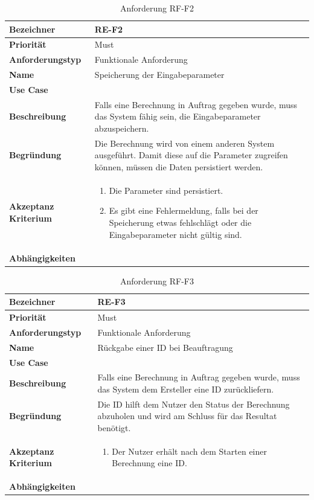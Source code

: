 \begin{table}[ht]
\centering
  \begin{tabular}{ l | p{8cm} }
	\hline
	\rowcolor{gray}
	\textbf{Bezeichner}&	\textbf{RE-F2}\\ \hline
	\textbf{Priorität} 		&	Must\\ \hline
	\textbf{Anforderungstyp}	&	Funktionale Anforderung\\ \hline
	\textbf{Name} 			&	Speicherung der Eingabeparameter\\ \hline
	\textbf{Use Case} 		&	\nameref{table:use_case_1}\\ \hline
	\textbf{Beschreibung} 	&	Falls eine Berechnung in Auftrag gegeben wurde, muss das System fähig sein, die Eingabeparameter abzuspeichern.\\ \hline
	\textbf{Begründung} 		&	Die Berechnung wird von einem anderen System ausgeführt. Damit diese auf die Parameter zugreifen können, müssen die Daten persistiert werden.\\ \hline
	\textbf{Akzeptanz Kriterium}	&	\begin{enumerate}
					\item Die Parameter sind persistiert.
					\item Es gibt eine Fehlermeldung, falls bei der Speicherung etwas fehlschlägt oder die Eingabeparameter nicht gültig sind.
					\end{enumerate}
					\\ \hline
	\textbf{Abhängigkeiten} 	&	\\ \hline
  \end{tabular}
   \caption{Anforderung RF-F2}\label{table:req_3}
\end{table}

\begin{table}[ht]
\centering
  \begin{tabular}{ l | p{8cm} }
	\hline
	\rowcolor{gray}
	\textbf{Bezeichner}&	\textbf{RE-F3}\\ \hline
	\textbf{Priorität} 		&	Must\\ \hline
	\textbf{Anforderungstyp}	&	Funktionale Anforderung\\ \hline
	\textbf{Name} 			&	Rückgabe einer ID bei Beauftragung\\ \hline
	\textbf{Use Case} 		&	\nameref{table:use_case_1}\\ \hline
	\textbf{Beschreibung} 	&	Falls eine Berechnung in Auftrag gegeben wurde, muss das System dem Ersteller eine ID zurückliefern.\\ \hline
	\textbf{Begründung} 		&	Die ID hilft dem Nutzer den Status der Berechnung abzuholen und wird am Schluss für das Resultat benötigt.\\ \hline
	\textbf{Akzeptanz Kriterium}	&	\begin{enumerate}
					\item Der Nutzer erhält nach dem Starten einer Berechnung eine ID.
					\end{enumerate}
					\\ \hline
	\textbf{Abhängigkeiten} 	&	\nameref{table:req_3}\\ \hline
  \end{tabular}
   \caption{Anforderung RF-F3}\label{table:req_2}
\end{table}

